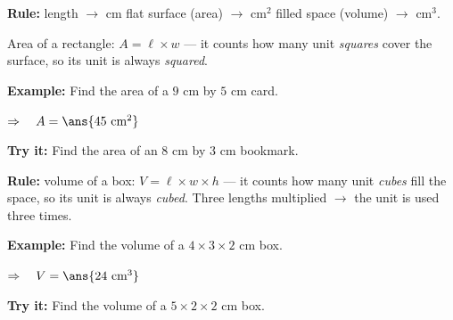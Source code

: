 \documentclass[12pt]{article}
\begin{document}


\begin{formulabox}
\textbf{Rule:} \quad length $\to$ cm \quad\textbullet\quad flat surface
(area) $\to$ cm$^2$ \quad\textbullet\quad filled space (volume) $\to$
cm$^3$.\par
Area of a rectangle: $A = \ell \times w$ --- it counts how many unit
\emph{squares} cover the surface, so its unit is always \emph{squared}.
\end{formulabox}

\begin{examplebox}
\textbf{Example:} \quad Find the area of a $9$ cm by $5$ cm card.

$\Rightarrow\quad A = \ans{45\ \text{cm}^2}$
\end{examplebox}

\begin{tryitbox}
\textbf{Try it:} \quad Find the area of an $8$ cm by $3$ cm bookmark.\\[2pt]
\end{tryitbox}


\begin{formulabox}
\textbf{Rule:} \quad volume of a box: $V = \ell \times w \times h$ --- it
counts how many unit \emph{cubes} fill the space, so its unit is always
\emph{cubed}. Three lengths multiplied $\to$ the unit is used three times.
\end{formulabox}

\begin{examplebox}
\textbf{Example:} \quad Find the volume of a $4 \times 3 \times 2$ cm box.

$\Rightarrow\quad V = \ans{24\ \text{cm}^3}$
\end{examplebox}

\begin{tryitbox}
\textbf{Try it:} \quad Find the volume of a $5 \times 2 \times 2$ cm box.\\[2pt]
\end{tryitbox}
\end{document}
